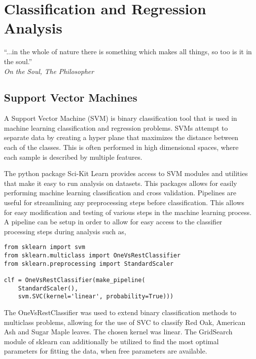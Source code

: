 \chapter{Classification and Regression Analysis}
\begin{center}
  \begin{minipage}{0.75\textwidth}
    \begin{small}
      “...in the whole of nature there is something which makes all things, so too is it in the soul.”\\
      \null\hfill\emph{On the Soul, The Philosopher}
    \end{small}
  \end{minipage}
  \vspace{0.5cm}
\end{center}

\section{Support Vector Machines}
A Support Vector Machine (SVM) is binary classification tool that is used in machine learning classification and regression problems.  SVMs attempt to separate data by creating a hyper plane that maximizes the distance between each of the classes.  This is often performed in high dimensional spaces, where each sample is described by multiple features.

The python package Sci-Kit Learn provides access to SVM modules and utilities that make it easy to run analysis on datasets.  This packages allows for easily performing machine learning classification and cross validation.  Pipelines are useful for streamlining any preprocessing steps before classification.  This allows for easy modification and testing of various steps in the machine learning process.  A pipeline can be setup in order to allow for easy access to the classifier processing steps during analysis such as,
%
\begin{lstlisting}
from sklearn import svm
from sklearn.multiclass import OneVsRestClassifier
from sklearn.preprocessing import StandardScaler

clf = OneVsRestClassifier(make_pipeline(
	StandardScaler(),
	svm.SVC(kernel='linear', probability=True)))

\end{lstlisting}
%
The OneVsRestClassifier was used to extend binary classification methods to multiclass problems, allowing for the use of SVC to classify Red Oak, American Ash and Sugar Maple leaves.  The chosen kernel was linear.  The GridSearch module of sklearn can additionally be utilized to find the most optimal parameters for fitting the data, when free parameters are available.

